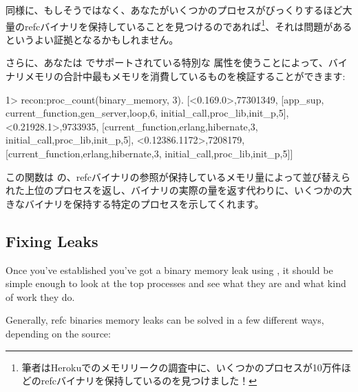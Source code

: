 同様に、もしそうではなく、あなたがいくつかのプロセスがびっくりするほど大量のrefcバイナリを保持していることを見つけるのであれば\footnote{筆者はHerokuでのメモリリークの調査中に、いくつかのプロセスが10万件ほどのrefcバイナリを保持しているのを見つけました！}、それは問題があるというよい証拠となるかもしれません。

さらに、あなたは  でサポートされている特別な  属性を使うことによって、バイナリメモリの合計中最もメモリを消費しているものを検証することができます:

\begin{VerbatimEshell}
1> recon:proc_count(binary_memory, 3).
[{<0.169.0>,77301349,
  [app_sup,
   {current_function,{gen_server,loop,6}},
   {initial_call,{proc_lib,init_p,5}}]},
 {<0.21928.1>,9733935,
  [{current_function,{erlang,hibernate,3}},
   {initial_call,{proc_lib,init_p,5}}]},
 {<0.12386.1172>,7208179,
  [{current_function,{erlang,hibernate,3}},
   {initial_call,{proc_lib,init_p,5}}]}]
\end{VerbatimEshell}

この関数は  の、refcバイナリの参照が保持しているメモリ量によって並び替えられた上位のプロセスを返し、バイナリの実際の量を返す代わりに、いくつかの大きなバイナリを保持する特定のプロセスを示してくれます。

\subsection{Fixing Leaks}

Once you've established you've got a binary memory leak using , it should be simple enough to look at the top processes and see what they are and what kind of work they do.

Generally, refc binaries memory leaks can be solved in a few different ways, depending on the source:

